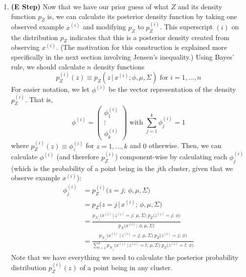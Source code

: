 \begin{algo}
\begin{enumerate}
      \item \textbf{(E Step)} Now that we have our prior guess of what $Z$ and its density function $p_Z$ is, we can calculate its posterior density function by taking one observed example $x^{(i)}$ and modifying $p_Z$ to $p_Z^{(i)}$. This superscript $(i)$ on the distribution $p_Z$ indicates that this is a posterior density created from observing $x^{(i)}$. (The motivation for this construction is explained more specifically in the next section involving Jensen's inequality.) Using Bayes' rule, we should calculate $n$ density functions 
      \begin{equation}
        p_Z^{(i)}(z) \equiv p_Z(z\,|\,x^{(i)}; \phi, \mu, \Sigma) \text{ for } i = 1, \ldots, n
      \end{equation}
      For easier notation, we let $\phi^{(i)}$ be the vector representation of the density $p_Z^{(i)}$. That is,
      \begin{equation}
        \phi^{(i)} = \begin{pmatrix} \phi_1^{(i)} \\ \vdots \\ \phi_k^{(i)} \end{pmatrix} \text{ with } \sum_{j=1}^k \phi_j^{(i)} = 1
      \end{equation}
      where $p_Z^{(i)}(z) \equiv \phi^{(i)}_z$ for $z = 1, \ldots, k$ and $0$ otherwise. Then, we can calculate $\phi^{(i)}$ (and therefore $p_Z^{(i)}$) component-wise by calculating each $\phi_j^{(i)}$ (which is the probability of a point being in the $j$th cluster, given that we observe example $x^{(i)}$):
      \begin{align*}
        \phi_j^{(i)} &= p_Z^{(i)}\big(z = j;\, \phi, \mu, \Sigma\big) \\
        &= p_Z\big(z = j\,|\,x^{(i)};\,\phi, \mu, \Sigma\big) \\
        &= \frac{p_{\mathcal{N}_j}\big(x^{(i)}\,|\,z^{(i)} = j;\,\mu, \Sigma\big) \; p_Z\big(z^{(i)} = j;\,\phi\big)}{p_X\big(x^{(i)};\,\phi, \mu, \Sigma\big)} \\
        &= \frac{p_{\mathcal{N}_j}\big(x^{(i)}\,|\,z^{(i)} = j;\,\mu, \Sigma\big) \; p_Z\big(z^{(i)} = j;\,\phi\big)}{\sum_{l=1}^k p_{\mathcal{N}_j}\big(x^{(i)}\,|\,z^{(i)} = l;\,\mu, \Sigma\big)\; p_Z\big(z^{(i)} = l;\,\phi\big)}
      \end{align*}
      Note that we have everything we need to calculate the posterior probability distribution $p_Z^{(i)}(z)$ of a point being in any cluster.
      \begin{itemize}

\end{itemize}
\end{enumerate}
\end{algo}
